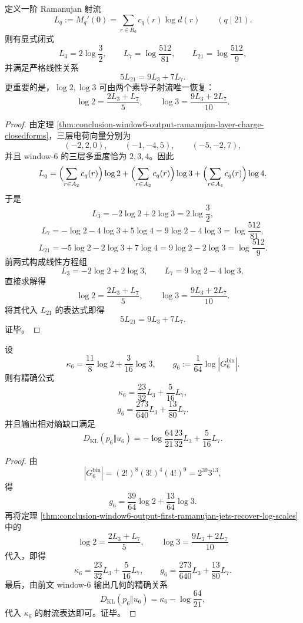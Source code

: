 \begin{theorem}\label{thm:conclusion-window6-output-first-ramanujan-jets-recover-log-scales}
定义一阶 Ramanujan 射流
\[
L_q:=M_q'(0)=\sum_{r\in R_6}c_q(r)\log d(r)
\qquad (q\mid 21).
\]
则有显式闭式
\[
L_3=2\log\frac32,
\qquad
L_7=\log\frac{512}{81},
\qquad
L_{21}=\log\frac{512}{9},
\]
并满足严格线性关系
\[
5L_{21}=9L_3+7L_7.
\]
更重要的是，\(\log 2,\log 3\) 可由两个素导子射流唯一恢复：
\[
\log 2=\frac{2L_3+L_7}{5},
\qquad
\log 3=\frac{9L_3+2L_7}{10}.
\]
\end{theorem}
\begin{proof}
由定理 \ref{thm:conclusion-window6-output-ramanujan-layer-charge-closedforms}，三层电荷向量分别为
\[
(-2,2,0),\qquad (-1,-4,5),\qquad (-5,-2,7),
\]
并且 window-\(6\) 的三层多重度恰为 \(2,3,4\)。因此
\[
L_q
=
\Bigl(\sum_{r\in A_2}c_q(r)\Bigr)\log 2
+
\Bigl(\sum_{r\in A_3}c_q(r)\Bigr)\log 3
+
\Bigl(\sum_{r\in A_4}c_q(r)\Bigr)\log 4.
\]
于是
\[
L_3=-2\log 2+2\log 3=2\log\frac32,
\]
\[
L_7=-\log 2-4\log 3+5\log 4
=9\log 2-4\log 3
=\log\frac{512}{81},
\]
\[
L_{21}=-5\log 2-2\log 3+7\log 4
=9\log 2-2\log 3
=\log\frac{512}{9}.
\]
前两式构成线性方程组
\[
L_3=-2\log 2+2\log 3,
\qquad
L_7=9\log 2-4\log 3,
\]
直接求解得
\[
\log 2=\frac{2L_3+L_7}{5},
\qquad
\log 3=\frac{9L_3+2L_7}{10}.
\]
将其代入 \(L_{21}\) 的表达式即得
\[
5L_{21}=9L_3+7L_7.
\]
证毕。
\end{proof}

\begin{corollary}\label{cor:conclusion-window6-output-entropy-gauge-density-linear-in-jets}
设
\[
\kappa_6=\frac{11}{8}\log 2+\frac{3}{16}\log 3,
\qquad
g_6:=\frac{1}{64}\log |G_6^{\mathrm{bin}}|.
\]
则有精确公式
\[
\kappa_6=\frac{23}{32}L_3+\frac{5}{16}L_7,
\]
\[
g_6=\frac{273}{640}L_3+\frac{13}{80}L_7.
\]
并且输出相对熵缺口满足
\[
D_{\mathrm{KL}}(p_6\Vert u_6)
=
-\log\frac{64}{21}
\frac{23}{32}L_3+\frac{5}{16}L_7.
\]
\end{corollary}
\begin{proof}
由
\[
|G_6^{\mathrm{bin}}|=(2!)^8(3!)^4(4!)^9=2^{39}3^{13},
\]
得
\[
g_6=\frac{39}{64}\log 2+\frac{13}{64}\log 3.
\]
再将定理 \ref{thm:conclusion-window6-output-first-ramanujan-jets-recover-log-scales} 中的
\[
\log 2=\frac{2L_3+L_7}{5},
\qquad
\log 3=\frac{9L_3+2L_7}{10}
\]
代入，即得
\[
\kappa_6=\frac{23}{32}L_3+\frac{5}{16}L_7,
\qquad
g_6=\frac{273}{640}L_3+\frac{13}{80}L_7.
\]
最后，由前文 window-\(6\) 输出几何的精确关系
\[
D_{\mathrm{KL}}(p_6\Vert u_6)=\kappa_6-\log\frac{64}{21},
\]
代入 \(\kappa_6\) 的射流表达即可。证毕。
\end{proof}

